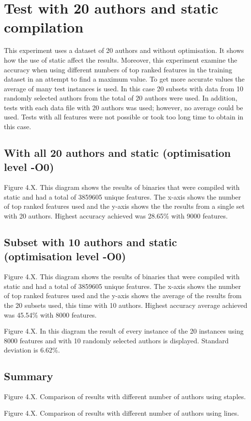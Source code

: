 \documentclass[a4paper,11pt]{kth-mag}
\begin{document}
\section{Test with 20 authors and static compilation}
This experiment uses a dataset of 20 authors and without  optimisation. It
shows how the use of static affect the results. Moreover, this experiment
examine the accuracy when using different numbers of top ranked features in the
training dataset in an attempt to find a maximum value.  To get more accurate
values the average of many test instances is used. In this case 20 subsets with
data from 10 randomly selected authors from the total of 20 authors were used.
In addition, tests with each data file with 20 authors was used; however, no
average could be used. Tests with all features were not possible or took too
long time to obtain in this case.   

\subsection{With all 20 authors and static (optimisation level -O0)}
Figure 4.X. This diagram shows the results of binaries that were compiled with
static and had a total of 3859605 unique features. The x-axis shows the number
of top ranked features used and the y-axis shows the the results from a single
set with 20 authors. Highest accuracy achieved was 28.65\% with 9000 features.

\subsection{Subset with 10 authors and static (optimisation level -O0)}
Figure 4.X. This diagram shows the results of binaries that were compiled with
static and had a total of 3859605 unique features. The x-axis shows the number
of top ranked features used and the y-axis shows the average of the results
from the 20 subsets used, this time with 10 authors. Highest accuracy average
achieved was 45.54\% with 8000 features.

Figure 4.X. In this diagram the result of every instance of the 20 instances
using 8000 features and with 10 randomly selected authors is displayed.
Standard deviation is 6.62\%.

\subsection{Summary}
Figure 4.X. Comparison of results with different number of authors using
staples.

Figure 4.X. Comparison of results with different number of authors using lines.
\end{document}
